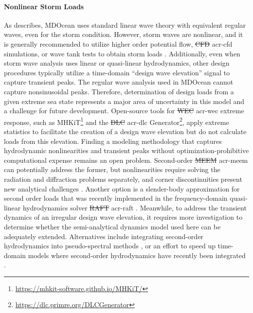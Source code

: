 \documentclass[a4paper,fleqn,colorlinks,unicode,lineno]{cas-dc} %
\makeatletter
\providecommand{\DIFdeltex}[1]{{\protect\color{red}\sout{#1}}} %
\providecommand{\DIFaddbegin}{} %
\providecommand{\DIFaddend}{} %
\providecommand{\DIFdelbegin}{} %
\providecommand{\DIFdelend}{} %
\providecommand{\DIFdel}[1]{\texorpdfstring{\DIFdeltex{#1}}{}} %
\providecommand{\DIFscaledelfig}{0.5}
\newlength{\DIFdelgraphicswidth} %
\newlength{\DIFdelgraphicsheight} %
\providecommand{\DIFaddincludegraphics}[2][]{{\color{blue}\fbox{\DIFOincludegraphics[#1]{#2}}}} %
\providecommand{\DIFdelincludegraphics}[2][]{%
\sbox{\DIFdelgraphicsbox}{\DIFOincludegraphics[#1]{#2}}%
\settoboxwidth{\DIFdelgraphicswidth}{\DIFdelgraphicsbox} %
\settoboxtotalheight{\DIFdelgraphicsheight}{\DIFdelgraphicsbox} %
\scalebox{\DIFscaledelfig}{%
\parbox[b]{\DIFdelgraphicswidth}{\usebox{\DIFdelgraphicsbox}\\[-\baselineskip] \rule{\DIFdelgraphicswidth}{0em}}\llap{\resizebox{\DIFdelgraphicswidth}{\DIFdelgraphicsheight}{%
\setlength{\unitlength}{\DIFdelgraphicswidth}%
\begin{picture}(1,1)%
\thicklines\linethickness{2pt} %
{\color[rgb]{1,0,0}\put(0,0){\framebox(1,1){}}}%
{\color[rgb]{1,0,0}\put(0,0){\line( 1,1){1}}}%
{\color[rgb]{1,0,0}\put(0,1){\line(1,-1){1}}}%
\end{picture}%
}\hspace*{3pt}}} %
} %
\DeclareRobustCommand{\DIFaddbegin}{\DIFOaddbegin \let\includegraphics\DIFaddincludegraphics} %
\DeclareRobustCommand{\DIFaddend}{\DIFOaddend \let\includegraphics\DIFOincludegraphics} %
\DeclareRobustCommand{\DIFdelbegin}{\DIFOdelbegin \let\includegraphics\DIFdelincludegraphics} %
\DeclareRobustCommand{\DIFdelend}{\DIFOaddend \let\includegraphics\DIFOincludegraphics} %
\let\sout@orig\sout %
\renewcommand{\sout}[1]{\ifmmode\text{\sout@orig{\ensuremath{#1}}}\else\sout@orig{#1}\fi} %
\makeatother
\begin{document}
    \paragraph{Nonlinear Storm Loads}
    As  describes, MDOcean uses standard linear wave theory with equivalent regular waves, even for the storm condition.
    However, storm waves are nonlinear, and it is generally recommended to utilize higher order potential flow, \DIFdelbegin \DIFdel{CFD }\DIFdelend \DIFaddbegin \gls{acr-cfd} \DIFaddend simulations, or wave tank tests to obtain storm loads \citep{coe_survey_2018}.
    Additionally, even when storm wave analysis uses linear or quasi-linear hydrodynamics, other design procedures typically utilize a time-domain ``design wave elevation'' signal to capture transient peaks.
    The regular wave analysis used in MDOcean cannot capture nonsinusoidal peaks.
    Therefore, determination of design loads from a given extreme sea state represents a major area of uncertainty in this model and a challenge for future development.
    Open-source tools for \DIFdelbegin \DIFdel{WEC }\DIFdelend \DIFaddbegin \gls{acr-wec} \DIFaddend extreme response, such as MHKiT\footnote{\url{https://mhkit-software.github.io/MHKiT/}} and the \DIFdelbegin \DIFdel{DLC }\DIFdelend \DIFaddbegin \gls{acr-dlc} \DIFaddend Generator\footnote{\url{https://dlc.primre.org/DLCGenerator}}, apply extreme statistics to facilitate the creation of a design wave elevation but do not calculate loads from this elevation.
    Finding a modeling methodology that captures hydrodynamic nonlinearities and transient peaks without optimization-prohibitive computational expense remains an open problem.
    Second-order \DIFdelbegin \DIFdel{MEEM }\DIFdelend \DIFaddbegin \gls{acr-meem} \DIFaddend can potentially address the former, but nonlinearities require solving the radiation and diffraction problems separately, and corner discontinuities present new analytical challenges \citep{cong_novel_2020,mavrakos_second-order_2009}.
    Another option is a slender-body approximation for second order loads that was recently implemented in the frequency-domain quasi-linear hydrodynamics solver \DIFdelbegin \DIFdel{RAFT }\DIFdelend \DIFaddbegin \gls{acr-raft} \DIFaddend \citep{carmo_slender-body_2025}.
    Meanwhile, to address the transient dynamics of an irregular design wave elevation, it requires more investigation to determine whether the semi-analytical dynamics model used here can be adequately extended.
    Alternatives include integrating second-order hydrodynamics into pseudo-spectral methods \citep{coe_initial_2020}, or an effort to speed up time-domain models where second-order hydrodynamics have recently been integrated \citep{issoglio_second-order_2026}.
\end{document}
